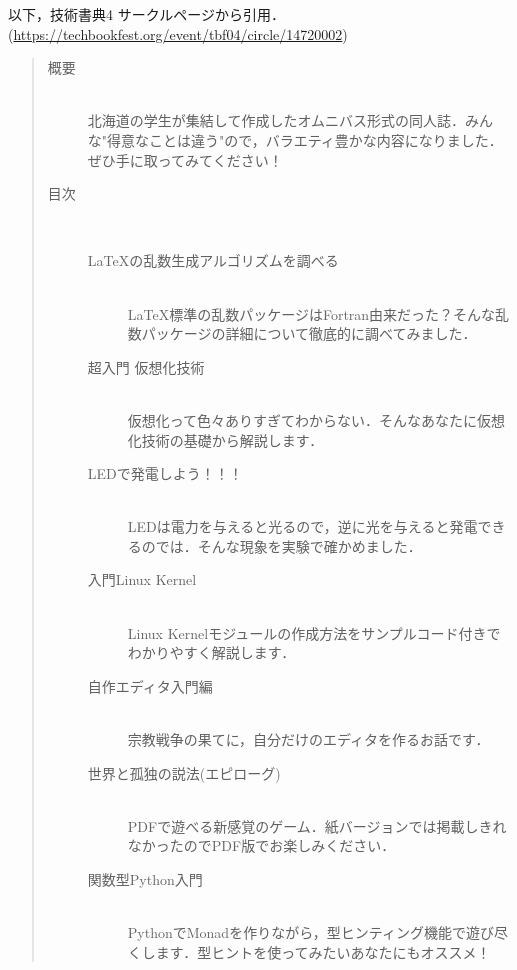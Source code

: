 以下，技術書典4 サークルページから引用．(\url{https://techbookfest.org/event/tbf04/circle/14720002})
\begin{quote}
\begin{description}
\item[概要]\mbox{}\\ 
北海道の学生が集結して作成したオムニバス形式の同人誌．みんな"得意なことは違う"ので，バラエティ豊かな内容になりました．ぜひ手に取ってみてください！

\item[目次]\mbox{}\\ 
\begin{description}
\item[\LaTeX の乱数生成アルゴリズムを調べる]\mbox{}\\ 
\LaTeX 標準の乱数パッケージはFortran由来だった？そんな乱数パッケージの詳細について徹底的に調べてみました．
\item[超入門 仮想化技術]\mbox{}\\ 
仮想化って色々ありすぎてわからない．そんなあなたに仮想化技術の基礎から解説します．
\item[LEDで発電しよう！！！]\mbox{}\\ 
LEDは電力を与えると光るので，逆に光を与えると発電できるのでは．そんな現象を実験で確かめました．
\item[入門Linux Kernel]\mbox{}\\ 
Linux Kernelモジュールの作成方法をサンプルコード付きでわかりやすく解説します．
\item[自作エディタ入門編]\mbox{}\\ 
宗教戦争の果てに，自分だけのエディタを作るお話です．
\item[世界と孤独の説法(エピローグ)]\mbox{}\\ 
PDFで遊べる新感覚のゲーム．紙バージョンでは掲載しきれなかったのでPDF版でお楽しみください．
\item[関数型Python入門]\mbox{}\\ 
PythonでMonadを作りながら，型ヒンティング機能で遊び尽くします．型ヒントを使ってみたいあなたにもオススメ！
\end{description}
\end{description}

\end{quote}
